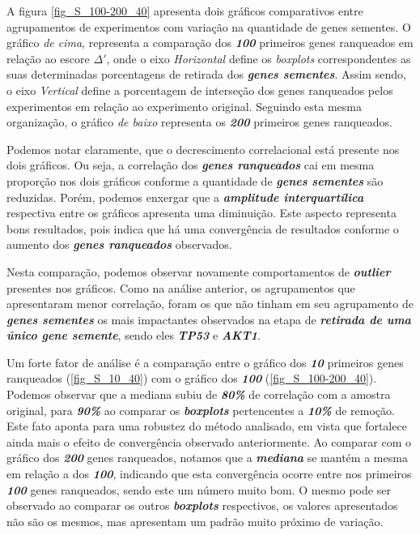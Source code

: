 A figura \ref{fig_S_100-200_40} apresenta dois gráficos comparativos entre agrupamentos de experimentos com variação na quantidade de genes sementes. O gráfico \textsl{de cima}, representa a comparação dos \textsl{\textbf{100}} primeiros genes ranqueados em relação ao escore $\Delta'$, onde o eixo \textsl{Horizontal} define os \textsl{boxplots} correspondentes as suas determinadas porcentagens de retirada dos \textsl{\textbf{genes sementes}}. Assim sendo, o eixo \textsl{Vertical} define a porcentagem de interseção dos genes ranqueados pelos experimentos em relação ao experimento original.
Seguindo esta mesma organização, o gráfico \textsl{de baixo} representa os \textsl{\textbf{200}} primeiros genes ranqueados.
%

Podemos notar claramente, que o decrescimento correlacional está presente nos dois gráficos. Ou seja, a correlação dos \textsl{\textbf{genes ranqueados}} cai em mesma proporção nos dois gráficos conforme a quantidade de \textsl{\textbf{genes sementes}} são reduzidas. Porém, podemos enxergar que a \textsl{\textbf{amplitude interquartílica}} respectiva entre os gráficos apresenta uma diminuição. Este aspecto representa bons resultados, pois indica que há uma convergência de resultados conforme o aumento dos \textsl{\textbf{genes ranqueados}} observados.
%

Nesta comparação, podemos observar novamente comportamentos de \textsl{\textbf{outlier}} presentes nos gráficos. Como na análise anterior, os agrupamentos que apresentaram menor correlação, foram os que não tinham em seu agrupamento de \textsl{\textbf{genes sementes}} os mais impactantes observados na etapa de \textsl{\textbf{retirada de uma único gene semente}}, sendo eles \textsl{\textbf{TP53}} e \textsl{\textbf{AKT1}}.
%

Um forte fator de análise é a comparação entre o gráfico dos \textsl{\textbf{10}} primeiros genes ranqueados (\ref{fig_S_10_40}) com o gráfico dos \textsl{\textbf{100}} (\ref{fig_S_100-200_40}). Podemos observar que a mediana subiu de \textsl{\textbf{80\%}} de correlação com a amostra original, para \textsl{\textbf{90\%}} ao comparar os \textsl{\textbf{boxplots}} pertencentes a \textsl{\textbf{10\%}} de remoção. Este fato aponta para uma robustez do método analisado, em vista que fortalece ainda mais o efeito de convergência observado anteriormente. Ao comparar com o gráfico dos \textsl{\textbf{200}} genes ranqueados, notamos que a \textsl{\textbf{mediana}} se mantém a mesma em relação a dos \textsl{\textbf{100}}, indicando que esta convergência ocorre entre nos primeiros \textsl{\textbf{100}} genes ranqueados, sendo este um número muito bom. O mesmo pode ser observado ao comparar os outros \textsl{\textbf{boxplots}} respectivos, os valores apresentados não são os mesmos, mas apresentam um padrão muito próximo de variação.



